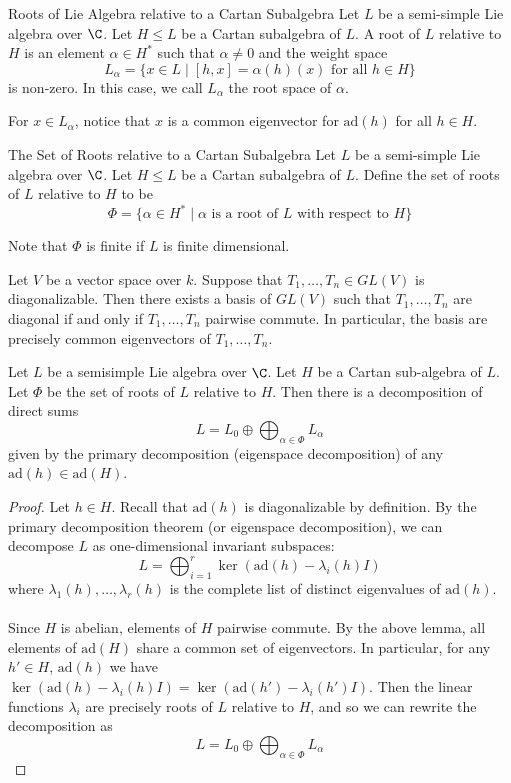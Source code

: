 \documentclass[a4paper]{article}
\begin{document}
\begin{defn}{Roots of Lie Algebra relative to a Cartan Subalgebra}{} Let $L$ be a semi-simple Lie algebra over $\C$. Let $H\leq L$ be a Cartan subalgebra of $L$. A root of $L$ relative to $H$ is an element $\alpha\in H^\ast$ such that $\alpha\neq 0$ and the weight space $$L_\alpha=\{x\in L\;|\;[h,x]=\alpha(h)(x)\text{ for all }h\in H\}$$ is non-zero. In this case, we call $L_\alpha$ the root space of $\alpha$. 
\end{defn}

For $x\in L_\alpha$, notice that $x$ is a common eigenvector for $\text{ad}(h)$ for all $h\in H$. 

\begin{defn}{The Set of Roots relative to a Cartan Subalgebra}{} Let $L$ be a semi-simple Lie algebra over $\C$. Let $H\leq L$ be a Cartan subalgebra of $L$. Define the set of roots of $L$ relative to $H$ to be $$\Phi=\{\alpha\in H^\ast\;|\;\alpha\text{ is a root of }L\text{ with respect to }H\}$$
\end{defn}

Note that $\Phi$ is finite if $L$ is finite dimensional. 

\begin{lmm}{}{} Let $V$ be a vector space over $k$. Suppose that $T_1,\dots,T_n\in GL(V)$ is diagonalizable. Then there exists a basis of $GL(V)$ such that $T_1,\dots,T_n$ are diagonal if and only if $T_1,\dots,T_n$ pairwise commute. In particular, the basis are precisely common eigenvectors of $T_1,\dots,T_n$. 
\end{lmm}

\begin{lmm}{}{} Let $L$ be a semisimple Lie algebra over $\C$. Let $H$ be a Cartan sub-algebra of $L$. Let $\Phi$ be the set of roots of $L$ relative to $H$. Then there is a decomposition of direct sums $$L=L_0\oplus\bigoplus_{\alpha\in\Phi}L_\alpha$$ given by the primary decomposition (eigenspace decomposition) of any $\text{ad}(h)\in\text{ad}(H)$. \tcbline
\begin{proof}
Let $h\in H$. Recall that $\text{ad}(h)$ is diagonalizable by definition. By the primary decomposition theorem (or eigenspace decomposition), we can decompose $L$ as one-dimensional invariant subspaces: $$L=\bigoplus_{i=1}^r\ker(\text{ad}(h)-\lambda_i(h)I)$$ where $\lambda_1(h),\dots,\lambda_r(h)$ is the complete list of distinct eigenvalues of $\text{ad}(h)$. \\~\\

Since $H$ is abelian, elements of $H$ pairwise commute. By the above lemma, all elements of $\text{ad}(H)$ share a common set of eigenvectors. In particular, for any $h'\in H$, $\text{ad}(h)$ we have $\ker(\text{ad}(h)-\lambda_i(h)I)=\ker(\text{ad}(h')-\lambda_i(h')I)$. Then the linear functions $\lambda_i$ are precisely roots of $L$ relative to $H$, and so we can rewrite the decomposition as $$L=L_0\oplus\bigoplus_{\alpha\in\Phi}L_\alpha$$
\end{proof}
\end{lmm}
\end{document}
